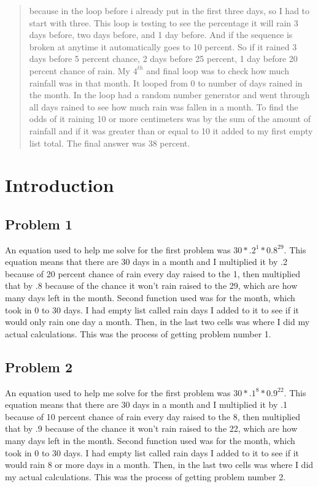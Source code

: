 \documentclass[twocolumn]{revtex4}
\begin{document}
\begin{abstract}
because in the loop before i already put in the first three days, so I had to start with three.  This loop is testing to see the percentage it will rain 3 days before, two days before, and 1 day before.  And if the sequence is broken at anytime it automatically goes to 10 percent.  So if it rained 3 days before 5 percent chance, 2 days before 25 percent, 1 day before 20 percent chance of rain. My $4^{th}$ and final loop was to check how much rainfall was in that month.  It looped from 0 to number of days rained in the month.  In the loop had a random number generator and went through all days rained to see how much rain was fallen in a month.  To find the odds of it raining 10 or more centimeters was by the sum of the amount of rainfall and if it was greater than or equal to 10 it added to my first empty list total.  The final answer was 38 percent.

\end{abstract}

\maketitle

\section{Introduction}

\subsection{Problem 1}
An equation used to help me solve for the first problem was $30 * .2^1 * 0.8^{29}$.  This equation means that there are 30 days in a month and I multiplied it by .2 because of 20 percent chance of rain every day raised to the 1, then multiplied that by .8 because of the chance it won't rain raised to the 29, which are how many days left in the month.  Second function used was for the month, which took in 0 to 30 days.  I had empty list called rain days I added to it to see if it would only rain one day a month.  Then, in the last two cells was where I did my actual calculations.  This was the process of getting problem number 1.

\subsection{Problem 2}
An equation used to help me solve for the first problem was $30 * .1^8 * 0.9^{22}$.  This equation means that there are 30 days in a month and I multiplied it by .1 because of 10 percent chance of rain every day raised to the 8, then multiplied that by .9 because of the chance it won't rain raised to the 22, which are how many days left in the month.  Second function used was for the month, which took in 0 to 30 days.  I had empty list called rain days I added to it to see if it would rain 8 or more days in a month.  Then, in the last two cells was where I did my actual calculations.  This was the process of getting problem number 2.
\end{document}
